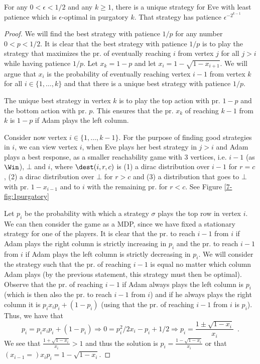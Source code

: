 \begin{lemma}\label{lem:purgatory}
For any $0<\epsilon<1/2$ and any $k\geq 1$, there is a unique strategy for Eve with least patience which is $\epsilon$-optimal in purgatory $k$. That strategy has patience $\epsilon^{-2^{k-1}}$
\end{lemma}
\begin{proof}
We will find the best strategy with patience $1/p$ for any number $0<p<1/2$.
It is clear that the best strategy with patience $1/p$ is to play the strategy that maximizes the pr. of eventually reaching $i$ from vertex $j$ for all $j>i$ while having patience $1/p$.
Let $x_k=1-p$ and let $x_i=1-\sqrt{1-x_{i+1}}$. We will argue that $x_i$ is the probability of eventually reaching vertex $i-1$ from vertex $k$ for all $i\in \{1,\dots,k\}$ and that there is a unique best strategy with patience $1/p$.

The unique best strategy in vertex $k$ is to play the top action with pr. $1-p$ and the bottom action with pr. $p$. This ensures that the pr. $x_k$ of reaching $k-1$ from $k$ is $1-p$ if Adam plays the left column.

Consider now vertex $i\in \{1,\dots,k-1\}$.
For the purpose of finding good strategies in $i$, we can view vertex $i$, when Eve plays her best strategy in $j>i$ and Adam plays a best response, as a smaller reachability game with 3 vertices, i.e. $i-1$ (as $\Win$), $\bot$ and $i$, where $\dest(i,r,c)$ is (1) a dirac distribution over $i-1$ for $r=c$, (2) a dirac distribution over $\bot$ for $r>c$ and (3) a distribution that goes to $\bot$ with pr. $1-x_{i-1}$ and to $i$ with the remaining pr. for $r<c$. See Figure \ref{7-fig:1purgatory}


Let $p_i$ be the probability with which a strategy $\sigma$ plays the top row in vertex $i$.
We can then consider the game as a MDP, since we have fixed a stationary strategy for one of the players.
It is clear that the pr. to reach $i-1$ from $i$ if Adam plays the right column is strictly increasing in $p_i$ and the pr. to reach $i-1$ from $i$ if Adam plays the left column is strictly decreasing in $p_i$. We will consider the strategy such that the pr. of reaching $i-1$ is equal no matter which column Adam plays (by the previous statement, this strategy must then be optimal).
Observe that the pr. of reaching $i-1$ if Adam always plays the left column is $p_i$ (which is then also the pr. to reach $i-1$ from $i$) and if he always plays the right column it is  $p_i x_i p_i+(1-p_i)$ (using that the pr. of reaching $i-1$ from $i$ is $p_i$).
Thus, we have that 
\[
p_i=p_i x_i p_i+(1-p_i)\Rightarrow 0=p_i^2/2 x_i-p_i+1/2 \Rightarrow p_i=\frac{1\pm \sqrt{1-x_i}}{x_i}\enspace .\] We see that $\frac{1+ \sqrt{1-x_i}}{x_i}>1$ and thus the solution is $p_i=\frac{1- \sqrt{1-x_i}}{x_i}$ or that $(x_{i-1}=)x_ip_i=1- \sqrt{1-x_i}$.


\end{proof}
